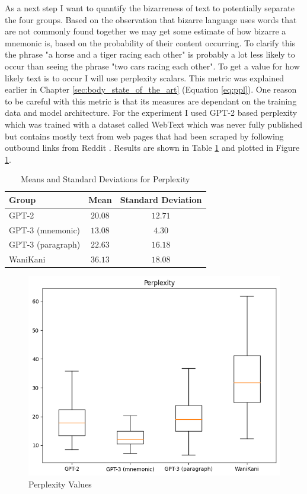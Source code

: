 As a next step I want to quantify the bizarreness of text to potentially separate the four groups. Based on the observation that bizarre language uses words that are not commonly found together we may get some estimate of how bizarre a mnemonic is, based on the probability of their content occurring. To clarify this the phrase "a horse and a tiger racing each other" is probably a lot less likely to occur than seeing the phrase "two cars racing each other". To get a value for how likely text is to occur I will use perplexity scalars. This metric was explained earlier in Chapter \ref{sec:body_state_of_the_art} (Equation \ref{eq:ppl}). One reason to be careful with this metric is that its measures are dependant on the training data and model architecture. For the experiment I used GPT-2 based perplexity which was trained with a dataset called WebText which was never fully published but contains mostly text from web pages that had been scraped by following outbound links from Reddit \cite{gpt2_hugging_face}. Results are shown in Table \ref{tab:ppl_whole_mnemonic} and plotted in Figure \ref{figure:ppl_whole_mnemonic}.     
\begin{table}[ht] 
\centering
\caption{Means and Standard Deviations for Perplexity}
\label{table:group_stats}
\begin{tabular}{lcc}
\toprule
Group & Mean & Standard Deviation \\
\midrule
GPT-2& $20.08$ & $12.71$ \\
GPT-3 (mnemonic) & $13.08$ & $4.30$ \\
GPT-3 (paragraph)& $22.63$ & $16.18$ \\
WaniKani & $36.13$ & $18.08$ \\
\bottomrule
\end{tabular}
\label{tab:ppl_whole_mnemonic}
\end{table}
\begin{figure}
    \centering
    \includegraphics[width=400pt]{resources/ppl_entire_mnemonic.png}
    \caption{Perplexity Values}
    \label{figure:ppl_whole_mnemonic}
\end{figure}

